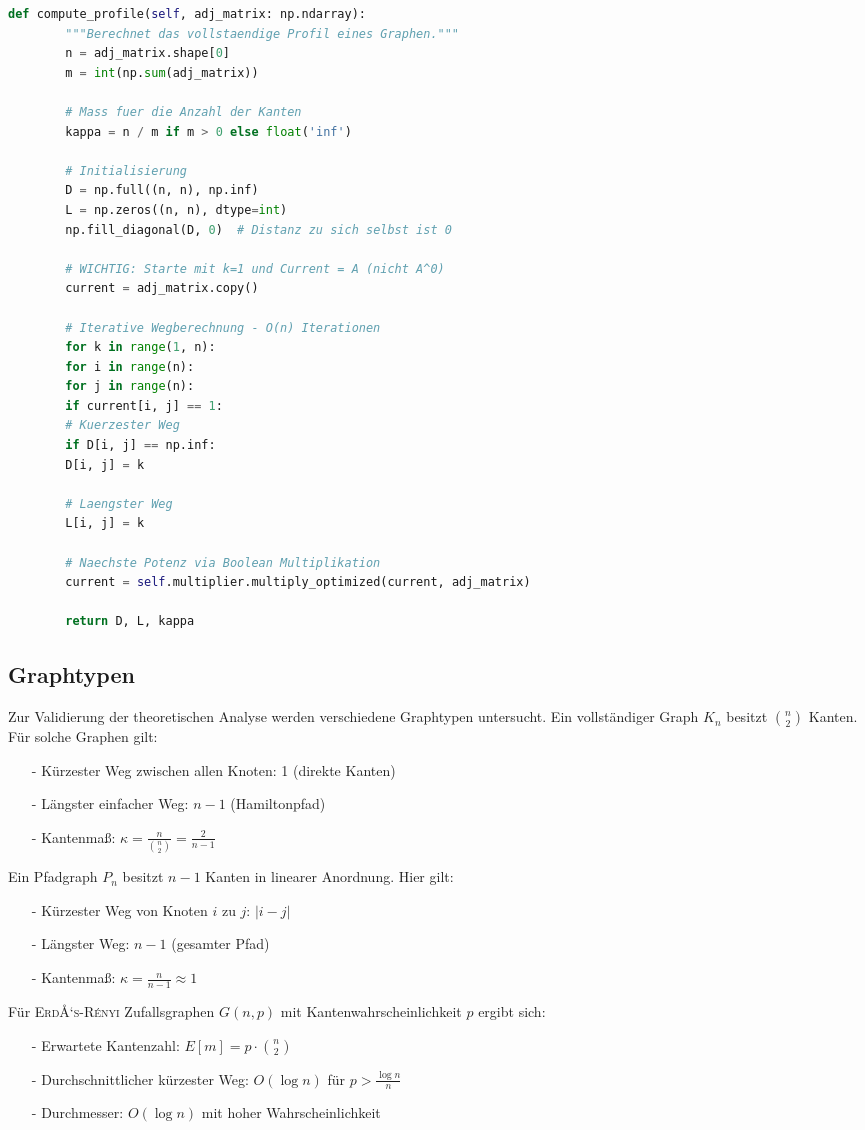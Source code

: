 ﻿\documentclass[a4paper,12pt]{article}
\theoremstyle{definition}
\begin{document}
	\begin{lstlisting}[language=Python, caption=Profilberechnung mit Signaturen, label=lst:cp]
		def compute_profile(self, adj_matrix: np.ndarray):
		"""Berechnet das vollstaendige Profil eines Graphen."""
		n = adj_matrix.shape[0]
		m = int(np.sum(adj_matrix))
		
		# Mass fuer die Anzahl der Kanten
		kappa = n / m if m > 0 else float('inf')
		
		# Initialisierung
		D = np.full((n, n), np.inf)
		L = np.zeros((n, n), dtype=int)
		np.fill_diagonal(D, 0)  # Distanz zu sich selbst ist 0
		
		# WICHTIG: Starte mit k=1 und Current = A (nicht A^0)
		current = adj_matrix.copy()
		
		# Iterative Wegberechnung - O(n) Iterationen
		for k in range(1, n):
		for i in range(n):
		for j in range(n):
		if current[i, j] == 1:
		# Kuerzester Weg
		if D[i, j] == np.inf:
		D[i, j] = k
		
		# Laengster Weg
		L[i, j] = k
		
		# Naechste Potenz via Boolean Multiplikation
		current = self.multiplier.multiply_optimized(current, adj_matrix)
		
		return D, L, kappa
	\end{lstlisting}
	
	\subsection{Graphtypen}
	
	Zur Validierung der theoretischen Analyse werden verschiedene Graphtypen untersucht. Ein vollständiger Graph $K_n$ besitzt $\binom{n}{2}$ Kanten. Für solche Graphen gilt:
	\begin{itemize}
		\item[-] Kürzester Weg zwischen allen Knoten: 1 (direkte Kanten)
		\item[-] Längster einfacher Weg: $n-1$ (Hamiltonpfad)
		\item[-] Kantenmaß: $\kappa = \frac{n}{\binom{n}{2}} = \frac{2}{n-1}$
	\end{itemize}
	Ein Pfadgraph $P_n$ besitzt $n-1$ Kanten in linearer Anordnung. Hier gilt:
	\begin{itemize}
		\item[-] Kürzester Weg von Knoten $i$ zu $j$: $|i-j|$
		\item[-] Längster Weg: $n-1$ (gesamter Pfad)
		\item[-] Kantenmaß: $\kappa = \frac{n}{n-1} \approx 1$
	\end{itemize}
	Für \textsc{ErdÅ‘s-Rényi} Zufallsgraphen $G(n,p)$ mit Kantenwahrscheinlichkeit $p$ ergibt sich:
	\begin{itemize}
		\item[-] Erwartete Kantenzahl: $E[m] = p \cdot \binom{n}{2}$
		\item[-] Durchschnittlicher kürzester Weg: $O(\log n)$ für $p > \frac{\log n}{n}$
		\item[-] Durchmesser: $O(\log n)$ mit hoher Wahrscheinlichkeit
	\end{itemize}
	
\end{document}

